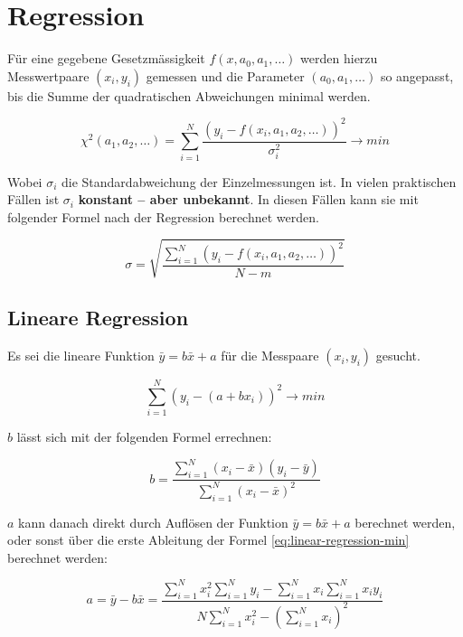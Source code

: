 \section{Regression}

F\"ur eine gegebene Gesetzm\"assigkeit $f(x, a_0, a_1, \ldots)$ werden hierzu Messwertpaare
$(x_i, y_i)$ gemessen und die Parameter $(a_0, a_1, \ldots)$ so angepasst, bis die Summe der quadratischen
Abweichungen minimal werden.

\begin{equation}
    \chi^2(a_1, a_2, \ldots) = \sum_{i=1}^{N} \frac{(y_i - f(x_i, a_1, a_2, \ldots))^2}{\sigma_i^2} \to min
\end{equation}

Wobei $\sigma_i$ die Standardabweichung der Einzelmessungen ist. In vielen praktischen F\"allen ist $\sigma_i$
\textbf{konstant -- aber unbekannt}. In diesen F\"allen kann sie mit folgender Formel nach der Regression
berechnet werden.

\begin{equation}
    \sigma = \sqrt{ \frac{\sum_{i=1}^{N} (y_i - f(x_i, a_1, a_2, \ldots))^2}{N-m} }
\end{equation}


\subsection{Lineare Regression}

Es sei die lineare Funktion $\bar{y}=b\bar{x} + a$ f\"ur die Messpaare $(x_i, y_i)$ gesucht.

\begin{equation}
    \sum_{i=1}^{N} (y_i - (a + bx_i))^2 \to min
    \label{eq:linear-regression-min}
\end{equation}

$b$ l\"asst sich mit der folgenden Formel errechnen:

\begin{equation}
    b = \frac{ \sum_{i=1}^{N} (x_i - \bar{x})(y_i - \bar{y}) }{ \sum_{i=1}^{N} (x_i - \bar{x})^2 }
\end{equation}

$a$ kann danach direkt durch Aufl\"osen der Funktion $\bar{y}=b\bar{x} + a$ berechnet werden, oder sonst
\"uber die erste Ableitung der Formel \ref{eq:linear-regression-min} berechnet werden:

\begin{equation}
    a = \bar{y} - b \bar{x} = \frac{ \sum_{i=1}^{N} x_i^2 \sum_{i=1}^{N} y_i - \sum_{i=1}^{N} x_i \sum_{i=1}^{N} x_i y_i }{ N \sum_{i=1}^{N} x_i^2 - (\sum_{i=1}^{N} x_i)^2 }
\end{equation}

